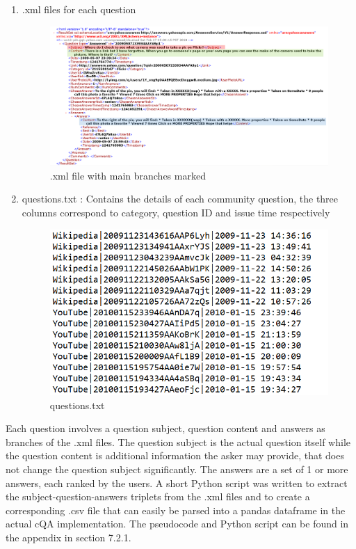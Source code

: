 \documentclass[12pt, a4paper]{article}
\begin{document}
\begin{enumerate}
    \item .xml files for each question 
    
    \begin{figure}[h]
        \includegraphics[scale=0.37]{xmlfileeg.png} 
        \centering 
        \caption{.xml file with main branches marked}
        \centering
    \end{figure} 
    \item questions.txt : Contains the details of each community question, the three columns correspond to category, question ID and issue time respectively 
    
    \begin{figure}[h]
        \includegraphics[scale=0.5]{questionstxt.png} 
        \centering 
        \caption{questions.txt}
        \centering
    \end{figure} 
\end{enumerate} 

Each question involves a question subject, question content and answers as branches of the .xml files. The question subject is the actual question itself while the question content is additional information the asker may provide, that does not change the question subject significantly. The answers are a set of 1 or more answers, each ranked by the users. A short Python script was written to extract the subject-question-answers triplets from the .xml files and to create a corresponding .csv file that can easily be parsed into a pandas dataframe in the actual cQA implementation. The pseudocode and Python script can be found in the appendix in section 7.2.1. 
\end{document}
